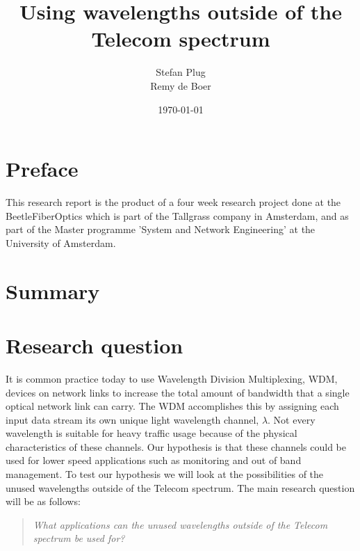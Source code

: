 \documentclass{article}
\begin{document}
\title{Using wavelengths outside of the Telecom spectrum}
\author{Stefan Plug\\Remy de Boer}
\date{\today}
\maketitle

\tableofcontents
\newpage

\section{Preface}
This research report is the product of a four week research project done at the BeetleFiberOptics which is part of the Tallgrass company in Amsterdam, and as part of the Master programme 'System and Network Engineering' at the University of Amsterdam\cite{uva:os3}. 

\newpage
\section{Summary}
\newpage
\section{Research question}
It is common practice today to use Wavelength Division Multiplexing, WDM, devices on network links to increase the total amount of bandwidth that a single optical network link can carry. The WDM accomplishes this by assigning each input data stream its own unique light wavelength channel, $\lambda$. 
Not every wavelength is suitable for heavy traffic usage because of the physical characteristics of these channels. Our hypothesis is that these channels could be used for lower speed applications such as monitoring and out of band management.
To test our hypothesis we will look at the possibilities of the unused wavelengths outside of the Telecom spectrum.
The main research question will be as follows:
\begin{quote}
\textit{
What applications can the unused wavelengths outside of the Telecom spectrum be used for?
}
\end{quote}
\end{document}
